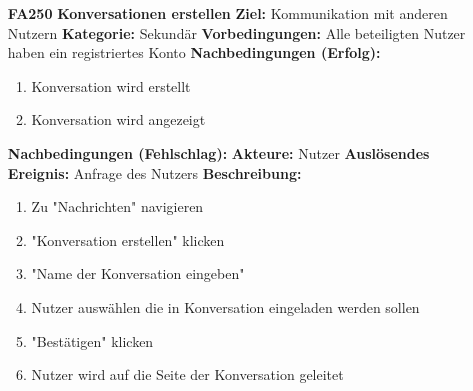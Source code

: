 \documentclass[parskip=full]{scrartcl}
\begin{document}
\begin{itemize}[nosep]
				
			\item[\textbf{FA250}]\textbf{ Konversationen erstellen}
			\newline \textbf{Ziel:} Kommunikation mit anderen Nutzern
			\newline \textbf{Kategorie:} Sekundär
			\newline \textbf{Vorbedingungen:} Alle beteiligten Nutzer haben ein registriertes Konto 
			\newline \textbf{Nachbedingungen (Erfolg):} 
			\begin{enumerate}[nosep]
				\item Konversation wird erstellt
				\item Konversation wird angezeigt 
			\end{enumerate}
			\textbf{Nachbedingungen (Fehlschlag):}
			\newline \textbf{Akteure:} Nutzer
			\newline \textbf{Auslösendes Ereignis:} Anfrage des Nutzers
			\newline \textbf{Beschreibung:}
			\begin{enumerate}[nosep]
				\item Zu "Nachrichten" navigieren
				\item "Konversation erstellen" klicken
				\item "Name der Konversation eingeben"
				\item Nutzer auswählen die in Konversation eingeladen werden sollen
				\item "Bestätigen" klicken
				\item Nutzer wird auf die Seite der Konversation geleitet\\
			\end{enumerate}
			

\end{itemize}
\end{document}
